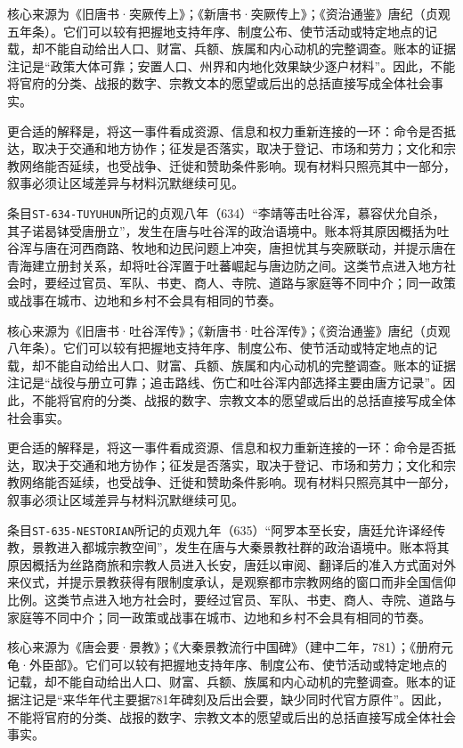 核心来源为《旧唐书·突厥传上》；《新唐书·突厥传上》；《资治通鉴》唐纪（贞观五年条）。它们可以较有把握地支持年序、制度公布、使节活动或特定地点的记载，却不能自动给出人口、财富、兵额、族属和内心动机的完整调查。账本的证据注记是“政策大体可靠；安置人口、州界和内地化效果缺少逐户材料”。因此，不能将官府的分类、战报的数字、宗教文本的愿望或后出的总括直接写成全体社会事实。

更合适的解释是，将这一事件看成资源、信息和权力重新连接的一环：命令是否抵达，取决于交通和地方协作；征发是否落实，取决于登记、市场和劳力；文化和宗教网络能否延续，也受战争、迁徙和赞助条件影响。现有材料只照亮其中一部分，叙事必须让区域差异与材料沉默继续可见。

条目\texttt{ST-634-TUYUHUN}所记的贞观八年（634）“李靖等击吐谷浑，慕容伏允自杀，其子诺曷钵受唐册立”，发生在唐与吐谷浑的政治语境中。账本将其原因概括为吐谷浑与唐在河西商路、牧地和边民问题上冲突，唐担忧其与突厥联动，并提示唐在青海建立册封关系，却将吐谷浑置于吐蕃崛起与唐边防之间。这类节点进入地方社会时，要经过官员、军队、书吏、商人、寺院、道路与家庭等不同中介；同一政策或战事在城市、边地和乡村不会具有相同的节奏。

核心来源为《旧唐书·吐谷浑传》；《新唐书·吐谷浑传》；《资治通鉴》唐纪（贞观八年条）。它们可以较有把握地支持年序、制度公布、使节活动或特定地点的记载，却不能自动给出人口、财富、兵额、族属和内心动机的完整调查。账本的证据注记是“战役与册立可靠；追击路线、伤亡和吐谷浑内部选择主要由唐方记录”。因此，不能将官府的分类、战报的数字、宗教文本的愿望或后出的总括直接写成全体社会事实。

更合适的解释是，将这一事件看成资源、信息和权力重新连接的一环：命令是否抵达，取决于交通和地方协作；征发是否落实，取决于登记、市场和劳力；文化和宗教网络能否延续，也受战争、迁徙和赞助条件影响。现有材料只照亮其中一部分，叙事必须让区域差异与材料沉默继续可见。

条目\texttt{ST-635-NESTORIAN}所记的贞观九年（635）“阿罗本至长安，唐廷允许译经传教，景教进入都城宗教空间”，发生在唐与大秦景教社群的政治语境中。账本将其原因概括为丝路商旅和宗教人员进入长安，唐廷以审阅、翻译后的准入方式面对外来仪式，并提示景教获得有限制度承认，是观察都市宗教网络的窗口而非全国信仰比例。这类节点进入地方社会时，要经过官员、军队、书吏、商人、寺院、道路与家庭等不同中介；同一政策或战事在城市、边地和乡村不会具有相同的节奏。

核心来源为《唐会要·景教》；《大秦景教流行中国碑》（建中二年，781）；《册府元龟·外臣部》。它们可以较有把握地支持年序、制度公布、使节活动或特定地点的记载，却不能自动给出人口、财富、兵额、族属和内心动机的完整调查。账本的证据注记是“来华年代主要据781年碑刻及后出会要，缺少同时代官方原件”。因此，不能将官府的分类、战报的数字、宗教文本的愿望或后出的总括直接写成全体社会事实。

